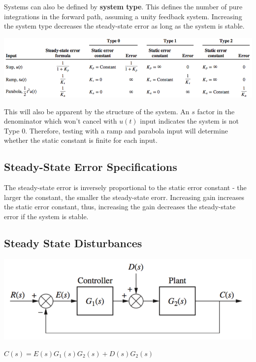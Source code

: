 \documentclass[11pt]{article}
\begin{document}
    Systems can also be defined by \textbf{system type}. This defines the number of pure integrations in the forward path, assuming a unity feedback system. Increasing the system type decreases the steady-state error as long as the system is stable.

    \begin{center}
        \includegraphics[width=300 px]{img/types} \\
    \end{center}

    This will also be apparent by the structure of the system. An $s$ factor in the denominator which won't cancel with $u(t)$ input indicates the system is not Type 0. Therefore, testing with a ramp and parabola input will determine whether the static constant is finite for each input.

    \subsection{Steady-State Error Specifications}

   The steady-state error is inversely proportional to the static error constant - the larger the constant, the smaller the steady-state erorr. Increasing gain increases the static error constant, thus, increasing the gain decreases the steady-state error if the system is stable.

   \subsection{Steady State Disturbances}

   \begin{center}
    \includegraphics[width=300 px]{img/disturbance} \\
    \end{center}

    $C(s) = E(s)G_1(s)G_2(s) + D(s)G_2(s)$ \\
    
\end{document}
